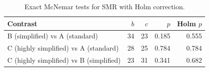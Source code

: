 \begin{table}[H]
\caption{Exact McNemar tests for SMR with Holm correction.}
\label{tab:sm:pairwise}
\centering
\begin{tabular}{lrrrr}
\toprule
Contrast & $b$ & $c$ & $p$ & Holm $p$ \\
\midrule
B (simplified) vs A (standard) & 34 & 23 & 0.185 & 0.555 \\
C (highly simplified) vs A (standard) & 28 & 25 & 0.784 & 0.784 \\
C (highly simplified) vs B (simplified) & 23 & 31 & 0.341 & 0.682 \\
\bottomrule
\end{tabular}
\end{table}
